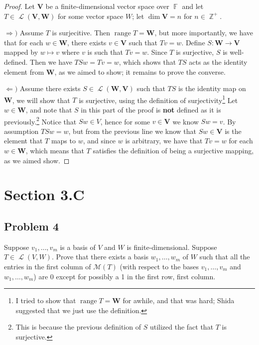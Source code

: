 \documentclass[letterpaper, 12pt]{amsart}
\DeclareMathOperator{\Z}{\mathbb{Z}}				%
\DeclareMathOperator{\F}{\mathbb{F}}				%
\DeclareMathOperator{\Ell}{\mathscr{L}}				%
\DeclareMathOperator{\range}{\text{range }}			%
\theoremstyle{definition}  							%
\newcommand{\Ra}{\Rightarrow}                   %
\newcommand{\La}{\Leftarrow}                    %
\begin{document}
		\begin{proof}
		Let $\mathbf{V}$ be a finite-dimensional vector space over $\F$ and let $T \in \Ell(\mathbf{V},\mathbf{W})$ for some vector space $W$; let $\dim \mathbf{V} = n$ for $n \in \Z^{+}$.

		$\Ra)$ Assume $T$ is surjecitive.
		Then $\range T = \mathbf{W}$, but more importantly, we have that for each $w \in \mathbf{W}$, there exists $v \in \mathbf{V}$ such that $Tv = w$.
		Define $S : \mathbf{W} \to \mathbf{V}$ mapped by $w \mapsto v$ where $v$ is such that $Tv = w$.
		Since $T$ is surjective, $S$ is well-defined.
		Then we have $TSw = Tv = w$, which shows that $TS$ acts as the identity element from $\mathbf{W}$, as we aimed to show; it remains to prove the converse.

		$\La)$ Assume there exists $S \in \Ell(\mathbf{W},\mathbf{V})$ such that $TS$ is the identity map on $\mathbf{W}$, we will show that $T$ is surjective, using the definition of surjectivity\footnote{I tried to show that $\range T = \textbf{W}$ for awhile, and that was hard; Shida suggested that we just use the definition.}
		Let $w \in \mathbf{W}$, and note that $S$ in this part of the proof is \textbf{not} defined as it is previously.\footnote{This is because the previous definition of $S$ utilized the fact that $T$ is surjective.}
		Notice that $Sw \in V$, hence for some $v \in \mathbf{V}$ we know $Sw = v$.
		By assumption $TSw = w$, but from the previous line we know that $Sw \in \mathbf{V}$ is the element that $T$ maps to $w$, and since $w$ is arbitrary, we have that $Tv = w$ for each $w \in \mathbf{W}$, which means that $T$ satisfies the definition of being a surjective mapping, as we aimed show.
		\end{proof}

	\section*{Section 3.C}
		\subsection*{Problem 4}
		Suppose $v_{1}, \dots, v_{m}$ is a basis of $V$ and $W$ is finite-dimensional. 
		Suppose $T \in \Ell(V,W)$. 
		Prove that there exists a basis $w_{1}, \dots, w_{m}$ of $W$ such that all the entries in the first column of $\mathcal{M}(T)$ (with respect to the bases $v_{1}, \dots, v_{m}$ and $w_{1}, \dots, w_{m}$) are 0 except for possibly a 1 in the first row, first column.
\end{document}
